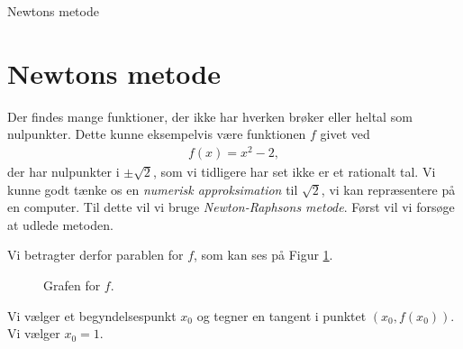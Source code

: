 \begin{center}
	\Huge
	Newtons metode
\end{center}

\section*{Newtons metode}

Der findes mange funktioner, der ikke har hverken brøker eller heltal som nulpunkter. Dette kunne eksempelvis være funktionen $f$ givet ved
\begin{align*}
	f(x) = x^2 - 2,
\end{align*}
der har nulpunkter i $\pm \sqrt{2}$, som vi tidligere har set ikke er et rationalt tal. Vi kunne godt tænke os en \textit{numerisk approksimation} til $\sqrt{2}$, vi kan repræsentere på en computer. Til dette vil vi bruge \textit{Newton-Raphsons metode}. Først vil vi forsøge at udlede metoden.

Vi betragter derfor parablen for $f$, som kan ses på Figur \ref{fig:parabel}.
\begin{figure}[H]
	\centering
	\caption{Grafen for $f$.}
	\label{fig:parabel}
\end{figure}

Vi vælger et begyndelsespunkt $x_0$ og tegner en tangent i punktet $(x_0,f(x_0))$. Vi vælger $x_0 = 1$. 

